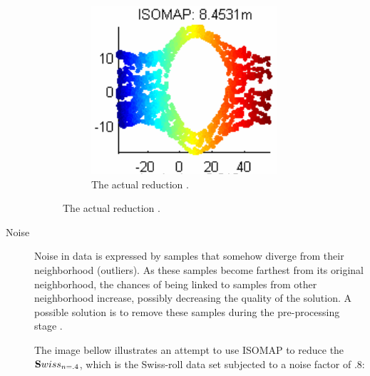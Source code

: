 \begin{description}
\begin{figure}[H]
		\begin{subfigure}[H]{.45\linewidth}
			\includegraphics[width=\linewidth]{img/convexity/actual.png}
			\captionsetup{justification=centering}
			\caption{The actual reduction \protect\footnotemark[6].}
		\end{subfigure}
	\end{figure}
	

	\newpage
	\item[Noise] Noise in data is expressed by samples that somehow diverge from their neighborhood (outliers). As these samples become farthest from its original neighborhood, the chances of being linked to samples from other neighborhood increase, possibly decreasing the quality of the solution. A possible solution is to remove these samples during the pre-processing stage \cite{herik2009}.

	The image bellow illustrates an attempt to use ISOMAP to reduce the $\mathbf{S}wiss_{n=.4}$, which is the Swiss-roll data set subjected to a noise factor of $.8$:


\end{description}
